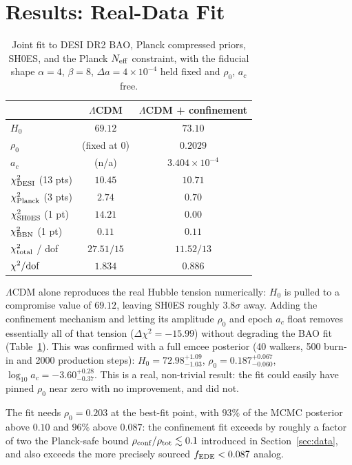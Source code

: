 \documentclass[11pt,a4paper,twocolumn]{article}
\begin{document}
\section{Results: Real-Data Fit}
\label{sec:results}
\begin{table}[t]
\centering
\small
\begin{tabular}{lcc}
\toprule
 & $\Lambda$CDM & $\Lambda$CDM + confinement \\
\midrule
$H_0$ & $69.12$ & $73.10$ \\
$\rho_0$ & (fixed at 0) & $0.2029$ \\
$a_c$ & (n/a) & $3.404\times10^{-4}$ \\
$\chi^2_{\rm DESI}$ (13 pts) & $10.45$ & $10.71$ \\
$\chi^2_{\rm Planck}$ (3 pts) & $2.74$ & $0.70$ \\
$\chi^2_{\rm SH0ES}$ (1 pt) & $14.21$ & $0.00$ \\
$\chi^2_{\rm BBN}$ (1 pt) & $0.11$ & $0.11$ \\
$\chi^2_{\rm total}$ / dof & $27.51/15$ & $11.52/13$ \\
$\chi^2/{\rm dof}$ & $1.834$ & $0.886$ \\
\bottomrule
\end{tabular}
\caption{Joint fit to DESI DR2 BAO, Planck compressed priors, SH0ES, and the Planck $N_{\rm eff}$ constraint, with the fiducial shape $\alpha = 4$, $\beta = 8$, $\Delta a = 4\times10^{-4}$ held fixed and $\rho_0$, $a_c$ free.}
\label{tab:mainfit}
\end{table}

$\Lambda$CDM alone reproduces the real Hubble tension numerically: $H_0$ is pulled to a compromise value of $69.12$, leaving SH0ES roughly $3.8\sigma$ away. Adding the confinement mechanism and letting its amplitude $\rho_0$ and epoch $a_c$ float removes essentially all of that tension ($\Delta\chi^2 = -15.99$) without degrading the BAO fit (Table~\ref{tab:mainfit}). This was confirmed with a full emcee posterior (40 walkers, 500 burn-in and 2000 production steps): $H_0 = 72.98^{+1.09}_{-1.03}$, $\rho_0 = 0.187^{+0.067}_{-0.060}$, $\log_{10} a_c = -3.60^{+0.28}_{-0.37}$. This is a real, non-trivial result: the fit could easily have pinned $\rho_0$ near zero with no improvement, and did not.

The fit needs $\rho_0 = 0.203$ at the best-fit point, with $93\%$ of the MCMC posterior above $0.10$ and $96\%$ above $0.087$: the confinement fit exceeds by roughly a factor of two the Planck-safe bound $\rho_{\rm conf}/\rho_{\rm tot} \lesssim 0.1$ introduced in Section~\ref{sec:data}, and also exceeds the more precisely sourced $f_{\rm EDE} < 0.087$ analog.
\end{document}
